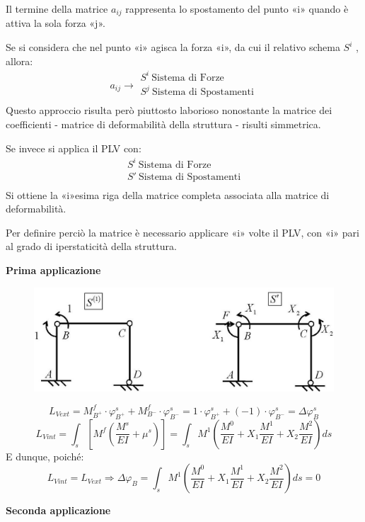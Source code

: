 \documentclass{article}
\begin{document}
\begin{adjustwidth}{2in}{}
		Il termine della matrice $ a_{ij} $ rappresenta lo spostamento del punto «i» quando è attiva la sola forza «j».
		
		Se si considera che nel punto «i» agisca la forza «i», da cui il relativo schema $ S^i $ , allora:
		\[
		a_{ij} \rightarrow \begin{array}{c}
			S^i ~ \text{Sistema di Forze} \\
			S^j ~ \text{Sistema di Spostamenti} \\			
		\end{array}
		\]
		Questo approccio risulta però piuttosto laborioso nonostante la matrice dei coefficienti - 
		matrice di deformabilità della struttura - risulti simmetrica.
		
		Se invece si applica il PLV con:
		\[ 
		\begin{array}{c}
			S^i ~ \text{Sistema di Forze} \\
			S' ~ \text{Sistema di Spostamenti} \\			
		\end{array}
		\]
		Si ottiene la «i»esima riga della matrice completa associata alla matrice di deformabilità.
		
		Per definire perciò la matrice è necessario applicare «i» volte il PLV, con «i» pari al grado di
		iperstaticità della struttura. \newline 

\textbf{Prima applicazione}	\newline

\begin{figure}[H]
	\centering
	\includegraphics[width=0.4\linewidth]{"immagini/1.PARTE8_Pagina_71 (2)"}
\end{figure}

		\[L_{Vext} = M_{B^+}^f \cdot \varphi_{B^+}^s + M_{B^-}^f \cdot \varphi_{B^-}^s = 1 \cdot \varphi_{B^+}^s + (-1) \cdot \varphi_{B^-}^s = \Delta\varphi_B^s \]
		\[ 
		L_{Vint} = \int_{s}\left[ M^f\left( \dfrac{M^s}{EI} +\mu^s \right)\right] = \int_{s} M^1\left( \dfrac{M^0}{EI}  +X_1\dfrac{M^1}{EI}+X_2\dfrac{M^2}{EI} \right) ds 		
		\]	
		E dunque, poiché:
		\[L_{Vint} = L_{Vext} \Rightarrow \Delta\varphi_B = \int_{s} M^1\left( \dfrac{M^0}{EI}  +X_1\dfrac{M^1}{EI}+X_2\dfrac{M^2}{EI} \right) ds = 0\]

\textbf{Seconda applicazione}	\newline


\end{adjustwidth}
\end{document}
